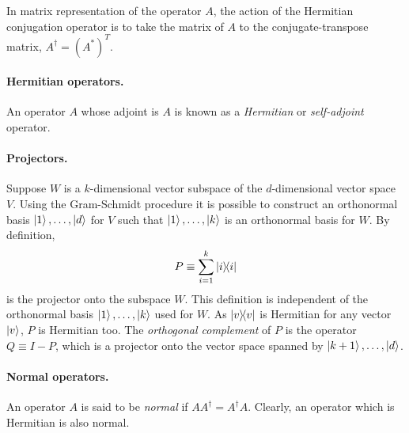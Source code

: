 \documentclass{article}
\numberwithin{theorem}{section}
\numberwithin{corollary}{section}
\begin{document}
In matrix representation of the operator $A$, the action of the Hermitian
conjugation operator is to take the matrix of $A$ to the conjugate-transpose
matrix, $A^{\dagger} = (A^*)^T$.

\paragraph{Hermitian operators.} An operator $A$ whose adjoint is $A$ is known
as a \emph{Hermitian} or \emph{self-adjoint} operator.

\paragraph{Projectors.} Suppose $W$ is a $k$-dimensional vector subspace of the
$d$-dimensional vector space $V$. Using the Gram-Schmidt procedure it is
possible to construct an orthonormal basis $\ket{1}, \ldots, \ket{d}$ for $V$
such that $\ket{1}, \ldots, \ket{k}$ is an orthonormal basis for $W$. By
definition, \[
  P \equiv \sum_{i=1}^k \op{i}{i}
\] is the projector onto the subspace $W$. This definition is independent of
the orthonormal basis $\ket{1}, \ldots, \ket{k}$ used for $W$. As $\op{v}{v}$
is Hermitian for any vector $\ket{v}$, $P$ is Hermitian too. The
\emph{orthogonal complement} of $P$ is the operator $Q \equiv I - P$, which is
a projector onto the vector space spanned by $\ket{k+1}, \ldots, \ket{d}$.

\paragraph{Normal operators.} An operator $A$ is said to be \emph{normal} if
$AA^{\dagger} = A^{\dagger}A$. Clearly, an operator which is Hermitian is also
normal.
\end{document}

